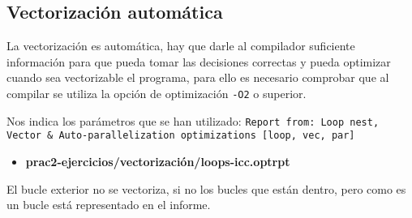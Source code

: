 \subsection{Vectorización automática}
\par La vectorización es automática, hay que darle al compilador suficiente información para que pueda tomar las decisiones correctas
y pueda optimizar cuando sea vectorizable el programa, para ello es necesario comprobar que al compilar se utiliza la opción de
optimización \texttt{-O2} o superior.

\par Nos indica los parámetros que se han utilizado: \texttt{Report from: Loop nest, Vector \& Auto-parallelization optimizations
[loop, vec, par]}
\begin{itemize}
    \item \textbf{prac2-ejercicios/vectorización/loops-icc.optrpt}

\end{itemize}
\par El bucle exterior no se vectoriza, si no los bucles que están dentro, pero como es un bucle está representado en el informe.



